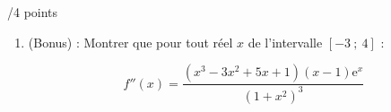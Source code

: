 \documentclass[a4paper]{article}
\begin{document}
\begin{exerciceinterro}{\hspace{2cm}/4 points}{}
\begin{enumerate}
\begin{enumerate}
\textit{En utilisant l'expression précédente de $f''$, répondre à la question : \og le toboggan assure-t-il de bonnes sensations ? \fg. Justifier.}

On étudie la convexité de $f$, donc on étudie le signe de $f''(x)$. D'après l'expression admise, $f''(x)$ est du signe de $p(x)(x-1)$. On en déduit le tableau :




\begin{center}
	\end{center}

	$f''$ s'annule deux fois en changeant de signe (ou $f$ change deux fois de convexité), donc $\mathcal{C}_f$ présente deux points d'inflexion.

	Le tobbogan assure donc de bonnes sensations.

	\end{enumerate}
	
	
	
	\item (Bonus) : Montrer que pour tout réel $x$ de l'intervalle $[-3~;~4]$ :

		\[f''(x) = \dfrac{(x^3-3x^2+5x+1)(x - 1)\text{e}^x}{\left(1 + x^2\right)^3}\]

\end{enumerate}

\bigskip


\end{exerciceinterro}

\pagebreak
\end{document}
